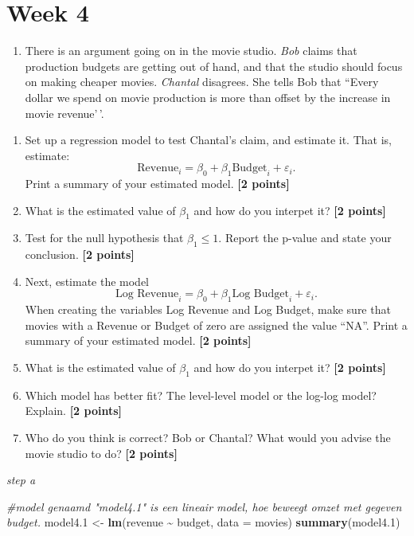 \documentclass[
]{article}
\newenvironment{Shaded}{\begin{snugshade}}{\end{snugshade}}
\newcommand{\AttributeTok}[1]{\textcolor[rgb]{0.13,0.29,0.53}{#1}}
\newcommand{\CommentTok}[1]{\textcolor[rgb]{0.56,0.35,0.01}{\textit{#1}}}
\newcommand{\FloatTok}[1]{\textcolor[rgb]{0.00,0.00,0.81}{#1}}
\newcommand{\FunctionTok}[1]{\textcolor[rgb]{0.13,0.29,0.53}{\textbf{#1}}}
\newcommand{\NormalTok}[1]{#1}
\newcommand{\OtherTok}[1]{\textcolor[rgb]{0.56,0.35,0.01}{#1}}
\newcommand{\SpecialCharTok}[1]{\textcolor[rgb]{0.81,0.36,0.00}{\textbf{#1}}}
\providecommand{\tightlist}{%
  \setlength{\itemsep}{0pt}\setlength{\parskip}{0pt}}
\begin{document}
\section{Week 4}\label{week-4}

\begin{enumerate}
\def\labelenumi{\arabic{enumi}.}
\tightlist
\item
  There is an argument going on in the movie studio. \emph{Bob} claims
  that production budgets are getting out of hand, and that the studio
  should focus on making cheaper movies. \emph{Chantal} disagrees. She
  tells Bob that ``Every dollar we spend on movie production is more
  than offset by the increase in movie revenue'\,'.
\end{enumerate}

\begin{enumerate}
\def\labelenumi{\alph{enumi}.}
\tightlist
\item
  Set up a regression model to test Chantal's claim, and estimate it.
  That is, estimate:
  \[\text{Revenue}_i=\beta_0+\beta_1 \text{Budget}_i +\varepsilon_i.\]
  Print a summary of your estimated model. \textbf{[2 points]}
\item
  What is the estimated value of \(\beta_1\) and how do you interpet it?
  \textbf{[2 points]}
\item
  Test for the null hypothesis that \(\beta_1 \leq 1\). Report the
  p-value and state your conclusion. \textbf{[2 points]}
\item
  Next, estimate the model
  \[\text{Log Revenue}_i=\beta_0+\beta_1 \text{Log Budget}_i +\varepsilon_i.\]
  When creating the variables Log Revenue and Log Budget, make sure that
  movies with a Revenue or Budget of zero are assigned the value ``NA''.
  Print a summary of your estimated model. \textbf{[2 points]}
\item
  What is the estimated value of \(\beta_1\) and how do you interpet it?
  \textbf{[2 points]}
\item
  Which model has better fit? The level-level model or the log-log
  model? Explain. \textbf{[2 points]}
\item
  Who do you think is correct? Bob or Chantal? What would you advise the
  movie studio to do? \textbf{[2 points]}
\end{enumerate}

\emph{step a}

\begin{Shaded}
\begin{Highlighting}[]
\CommentTok{\#model genaamd "model4.1" is een lineair model, hoe beweegt omzet met gegeven budget. }
\NormalTok{model4}\FloatTok{.1} \OtherTok{\textless{}{-}} \FunctionTok{lm}\NormalTok{(revenue }\SpecialCharTok{\textasciitilde{}}\NormalTok{ budget, }\AttributeTok{data =}\NormalTok{ movies)}
\FunctionTok{summary}\NormalTok{(model4}\FloatTok{.1}\NormalTok{)}
\end{Highlighting}
\end{Shaded}
\end{document}
